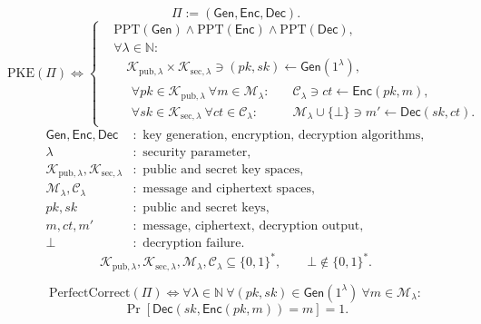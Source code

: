 \documentclass[12pt,a4paper]{article}
\begin{document}
\begin{definition}
\[
\Pi := (\mathsf{Gen},\mathsf{Enc},\mathsf{Dec}).
\]
\[
\mathrm{PKE}(\Pi)\iff
\left\{
\begin{aligned}
&\mathrm{PPT}(\mathsf{Gen})\land
\mathrm{PPT}(\mathsf{Enc})\land
\mathrm{PPT}(\mathsf{Dec}),\\[3pt]
&\forall\lambda\in\mathbb{N}:\\[2pt]
&\quad\mathcal{K}_{\mathrm{pub},\lambda}\times\mathcal{K}_{\mathrm{sec},\lambda}
\ni(pk,sk)\longleftarrow\mathsf{Gen}(1^\lambda),\\[3pt]
&\quad\begin{aligned}
\forall pk\in\mathcal{K}_{\mathrm{pub},\lambda}\ \forall m\in\mathcal{M}_\lambda:
&\quad\mathcal{C}_\lambda\ni ct\longleftarrow\mathsf{Enc}(pk,m),\\[3pt]
\forall sk\in\mathcal{K}_{\mathrm{sec},\lambda}\ \forall ct\in\mathcal{C}_\lambda:
&\quad\mathcal{M}_\lambda\cup\{\bot\}\ni m'\longleftarrow\mathsf{Dec}(sk,ct).
\end{aligned}
\end{aligned}
\right.
\]
\[
\begin{aligned}
\mathsf{Gen},\mathsf{Enc},\mathsf{Dec}&:\text{ key generation, encryption, decryption algorithms},\\
\lambda&:\text{ security parameter},\\
\mathcal{K}_{\mathrm{pub},\lambda},\mathcal{K}_{\mathrm{sec},\lambda}
&:\text{ public and secret key spaces},\\
\mathcal{M}_\lambda,\mathcal{C}_\lambda&:\text{ message and ciphertext spaces},\\
pk,sk&:\text{ public and secret keys},\\
m,ct,m'&:\text{ message, ciphertext, decryption output},\\
\bot&:\text{ decryption failure}.
\end{aligned}
\]
\[
\mathcal{K}_{\mathrm{pub},\lambda},\mathcal{K}_{\mathrm{sec},\lambda},
\mathcal{M}_\lambda,\mathcal{C}_\lambda\subseteq\{0,1\}^{*},
\qquad\bot\notin\{0,1\}^{*}.
\]
\end{definition}

\begin{definition}
\[
\mathrm{PerfectCorrect}(\Pi)\iff
\forall\lambda\in\mathbb{N}\ 
\forall(pk,sk)\in\mathsf{Gen}(1^\lambda)\ 
\forall m\in\mathcal{M}_\lambda:
\]
\[
\Pr\!\left[\mathsf{Dec}(sk,\mathsf{Enc}(pk,m))=m\right]=1.
\]
\end{definition}
\end{document}
